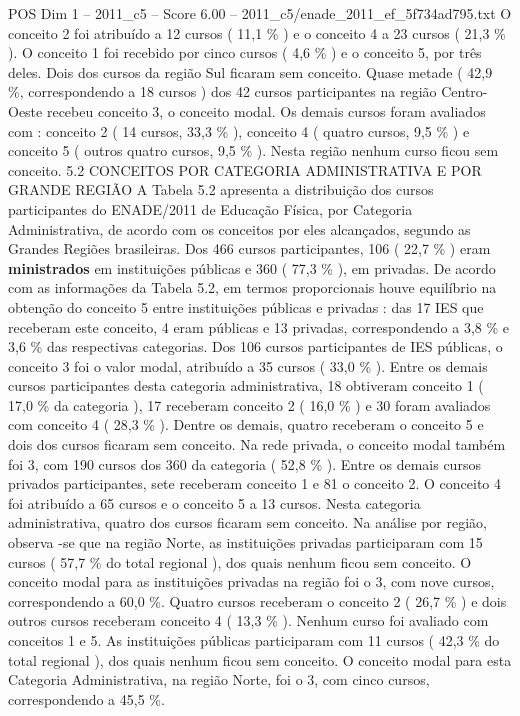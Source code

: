 \begin{textsample}{POS Dim 1 – 2011\_c5 – Score 6.00 – 2011\_c5/enade\_2011\_ef\_5f734ad795.txt}
O conceito 2 foi atribuído a 12 cursos ( 11,1 \% ) e o conceito 4 a 23 cursos ( 21,3 \% ).
O conceito 1 foi recebido por cinco cursos ( 4,6 \% ) e o conceito 5, por três deles.
Dois dos cursos da região Sul ficaram sem conceito.
Quase metade ( 42,9 \%, correspondendo a 18 cursos ) dos 42 cursos participantes na região Centro-Oeste recebeu conceito 3, o conceito modal.
Os demais cursos foram avaliados com : conceito 2 ( 14 cursos, 33,3 \% ), conceito 4 ( quatro cursos, 9,5 \% ) e conceito 5 ( outros quatro cursos, 9,5 \% ).
Nesta região nenhum curso ficou sem conceito. 5.2 CONCEITOS POR CATEGORIA ADMINISTRATIVA E POR GRANDE REGIÃO A Tabela 5.2 apresenta a distribuição dos cursos participantes do ENADE/2011 de Educação Física, por Categoria Administrativa, de acordo com os conceitos por eles alcançados, segundo as Grandes Regiões brasileiras.
Dos 466 cursos participantes, 106 ( 22,7 \% ) eram \textbf{ministrados} em instituições públicas e 360 ( 77,3 \% ), em privadas.
De acordo com as informações da Tabela 5.2, em termos proporcionais houve equilíbrio na obtenção do conceito 5 entre instituições públicas e privadas : das 17 IES que receberam este conceito, 4 eram públicas e 13 privadas, correspondendo a 3,8 \% e 3,6 \% das respectivas categorias.
Dos 106 cursos participantes de IES públicas, o conceito 3 foi o valor modal, atribuído a 35 cursos ( 33,0 \% ).
Entre os demais cursos participantes desta categoria administrativa, 18 obtiveram conceito 1 ( 17,0 \% da categoria ), 17 receberam conceito 2 ( 16,0 \% ) e 30 foram avaliados com conceito 4 ( 28,3 \% ).
Dentre os demais, quatro receberam o conceito 5 e dois dos cursos ficaram sem conceito.
Na rede privada, o conceito modal também foi 3, com 190 cursos dos 360 da categoria ( 52,8 \% ).
Entre os demais cursos privados participantes, sete receberam conceito 1 e 81 o conceito 2.
O conceito 4 foi atribuído a 65 cursos e o conceito 5 a 13 cursos.
Nesta categoria administrativa, quatro dos cursos ficaram sem conceito.
Na análise por região, observa -se que na região Norte, as instituições privadas participaram com 15 cursos ( 57,7 \% do total regional ), dos quais nenhum ficou sem conceito.
O conceito modal para as instituições privadas na região foi o 3, com nove cursos, correspondendo a 60,0 \%.
Quatro cursos receberam o conceito 2 ( 26,7 \% ) e dois outros cursos receberam conceito 4 ( 13,3 \% ).
Nenhum curso foi avaliado com conceitos 1 e 5.
As instituições públicas participaram com 11 cursos ( 42,3 \% do total regional ), dos quais nenhum ficou sem conceito.
O conceito modal para esta Categoria Administrativa, na região Norte, foi o 3, com cinco cursos, correspondendo a 45,5 \%.

\end{textsample}
